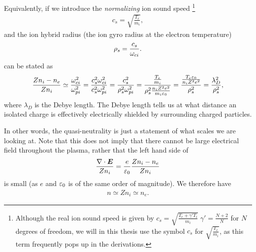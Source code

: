 Equivalently, if we introduce the \emph{normalizing} ion sound speed%
%
\footnote{Although the real ion sound speed is given by $c_s=\sqrt{\frac{T_e+\gamma' T_i}{m_i}}\;\gamma'=\frac{N+2}{N}$ for $N$ degrees of freedom, we will in this thesis use the symbol $c_s$ for $\sqrt{\frac{T_e}{m_i}}$, as this term frequently pops up in the derivations.}
%
\begin{align*}
    c_s = \sqrt{\frac{T_e}{m_i}},
\end  {align*}
%
and the ion hybrid radius (the ion gyro radius at the electron temperature)
%
\begin{align*}
    \rho_s=\frac{c_s}{\omega_{ci}}.
\end  {align*}
%
 can be stated as
%
\begin{align*}
    \frac{Zn_i - n_e}{Zn_i}
    \simeq
    \frac{\omega_{ci}^2}{\omega_{pi}^2}
    =
    \frac{c_s^2\omega_{ci}^2}{c_s^2\omega_{pi}^2}
    =
    \frac{c_s^2}{\rho_s^2\omega_{pi}^2}
    =
    \frac{\frac{T_e}{m_i}}{\rho_s^2\frac{n_iZ^2e^2}{m_i\varepsilon_0}}
    =
    \frac{\frac{T_e\varepsilon_0}{n_iZ^2e^2}}{\rho_s^2}
    =
    \frac{\lambda_D^2}{\rho_s^2},
\end{align*}
%
where $\lambda_D$ is the Debye length.
The Debye length tells us at what distance an isolated charge is effectively electrically shielded by surrounding charged particles.

In other words, the quasi-neutrality is just a statement of what scales we are looking at.
Note that this does not imply that there cannot be large electrical field throughout the plasma, rather that the left hand side of
%
\begin{align*}
    \frac{\nabla\cdot \boldsymbol{E}}{Zn_i} = \frac{e}{\varepsilon_0} \frac{Zn_i-n_e}{Zn_i}
\end{align*}
%
is small (as $e$ and $\varepsilon_0$ is of the same order of magnitude).
We therefore have
%
\begin{align*}
    n\simeq Zn_i \simeq n_e.
\end{align*}

